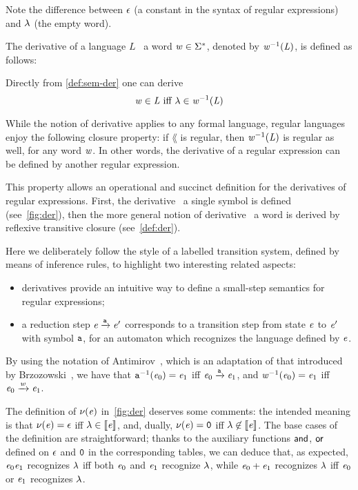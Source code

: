 Note the difference between $\mathtt {\epsilon}$ (a constant in the syntax of regular expressions) and $\lambda$ (the empty word).

The derivative of a language $L$ \wrt~a word $\mathit {w}\in\Sigma^*$, denoted by $\mathit {w}^{-1}(\mathit {L})$, is defined as follows:
Directly from \cref{def:sem-der} one can derive
\begin{equation}
 \label{eq:der}
 \mathit {w}\in\mathit {L} \mbox{ iff }
 \lambda\in\mathit {w}^{-1}(\mathit {L})
\end{equation}

While the notion of derivative applies to any formal language, regular languages enjoy the following closure property: if $\lang$ is regular, then
$\mathit {w}^{-1}(\mathit {L})$ is regular as well, for any word $\mathit {w}$. In other words, the derivative of a regular expression can be defined by another regular expression.

This property allows an operational and succinct definition for the derivatives of regular expressions.
First, the derivative \wrt~a single symbol is defined (see~\cref{fig:der}), then
the more general notion of derivative \wrt~a word is derived by reflexive  transitive closure (see~\cref{def:der}).

Here we deliberately follow the style of a labelled transition system, defined by means of inference rules, to highlight two interesting related aspects:
\begin{itemize}
 \item derivatives provide an intuitive way to define a small-step semantics for regular expressions;
 \item a reduction step $\mathit {e}\xrightarrow{\mathtt {a}}\mathit {e}'$ corresponds to a transition step from state $\mathit {e}$ to $\mathit {e}'$ with symbol $\mathtt {a}$, for an automaton which recognizes the language defined by $\mathit {e}$.
\end{itemize}
By using the notation of Antimirov~\cite{Antimirov96}, which is an adaptation of that introduced by Brzozowski~\cite{Brzozowski64}, we have
that $\mathtt {a}^{-1}(\mathit {e}_0)=\mathit {e}_1$ iff $\mathit {e}_0\xrightarrow{\mathtt {a}}\mathit {e}_1$, and $\mathit {w}^{-1}(\mathit {e}_0)=\mathit {e}_1$ iff $\mathit {e}_0\xrightarrow{\mathit {w}}\mathit {e}_1$.

The definition of $\nu({\mathit {e}})$ in~\cref{fig:der} deserves some comments:
the intended meaning is that $\nu({\mathit {e}})=\mathtt {\epsilon}$ iff
$\lambda\in\left\llbracket{\ensuremath{\mathit {e}}}\right\rrbracket$, and, dually, $\nu({\mathit {e}})=\mathtt {0}$ iff
$\lambda\not\in\left\llbracket{\ensuremath{\mathit {e}}}\right\rrbracket$. The base cases of the definition are straightforward; thanks to the auxiliary functions $\mathbin{\mathsf{and}}$, $\mathbin{\mathsf{or}}$ defined on $\mathtt {\epsilon}$ and $\mathtt {0}$ in the corresponding tables, we can deduce that, as expected, $\mathit {e}_0\mathit {e}_1$ recognizes $\lambda$ iff both $\mathit {e}_0$ and $\mathit {e}_1$ recognize $\lambda$, while  $\mathit {e}_0\mathbin{+}\mathit {e}_1$ recognizes $\lambda$ iff $\mathit {e}_0$ or $\mathit {e}_1$ recognizes $\lambda$.

